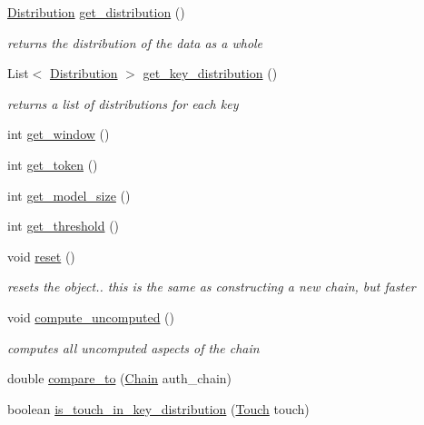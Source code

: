 \begin{DoxyCompactItemize}
\hyperlink{classcomponents_1_1_distribution}{Distribution} \hyperlink{classcomponents_1_1_chain_ae3cf3859627624dd155cf1507514cf20}{get\+\_\+distribution} ()
\begin{DoxyCompactList}\small\item\em returns the distribution of the data as a whole \end{DoxyCompactList}\item 
List$<$ \hyperlink{classcomponents_1_1_distribution}{Distribution} $>$ \hyperlink{classcomponents_1_1_chain_a654c25d3edab107ad77710428f11280c}{get\+\_\+key\+\_\+distribution} ()
\begin{DoxyCompactList}\small\item\em returns a list of distributions for each key \end{DoxyCompactList}\item 
int \hyperlink{classcomponents_1_1_chain_a1eb6b4a7d6cb462910932e29b3ab732e}{get\+\_\+window} ()
\item 
int \hyperlink{classcomponents_1_1_chain_ac6aca5adf04bb1500c1d8735cd7d5881}{get\+\_\+token} ()
\item 
int \hyperlink{classcomponents_1_1_chain_a545c320b4e5cc5e150ec6b07f8870fa1}{get\+\_\+model\+\_\+size} ()
\item 
int \hyperlink{classcomponents_1_1_chain_a128ee372728530d787a9512350dad405}{get\+\_\+threshold} ()
\item 
void \hyperlink{classcomponents_1_1_chain_a620eea641b4a673af78000c2ef5af576}{reset} ()
\begin{DoxyCompactList}\small\item\em resets the object.. this is the same as constructing a new chain, but faster \end{DoxyCompactList}\item 
void \hyperlink{classcomponents_1_1_chain_a401a39b68da4ae8ba64e02af94e68f15}{compute\+\_\+uncomputed} ()
\begin{DoxyCompactList}\small\item\em computes all uncomputed aspects of the chain \end{DoxyCompactList}\item 
double \hyperlink{classcomponents_1_1_chain_ab23f30bde8f169d73c3a3e5588bf75c6}{compare\+\_\+to} (\hyperlink{classcomponents_1_1_chain}{Chain} auth\+\_\+chain)
\item 
boolean \hyperlink{classcomponents_1_1_chain_a8bb0e379e0102b0443c38ef174fe83cc}{is\+\_\+touch\+\_\+in\+\_\+key\+\_\+distribution} (\hyperlink{classcomponents_1_1_touch}{Touch} touch)

\end{DoxyCompactItemize}
